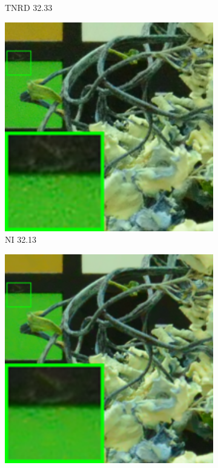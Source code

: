 \begin{figure}
\begin{subfigure}[t]{0.19\textwidth}
\caption{TNRD 32.33}
    \end{subfigure}
    \hfill
    \begin{subfigure}[t]{0.19\textwidth}
        \centering
        \includegraphics[width=1\textwidth]{images/mcwnnm/cc/resize_br_NI_CC15_d800_iso6400_2.png}
\caption{NI 32.13}
    \end{subfigure}
\hfill
    \begin{subfigure}[t]{0.19\textwidth}
        \centering
        \includegraphics[width=1\textwidth]{images/mcwnnm/cc/resize_br_NC_CC15_d800_iso6400_2.png}

\end{subfigure}
\end{figure}
